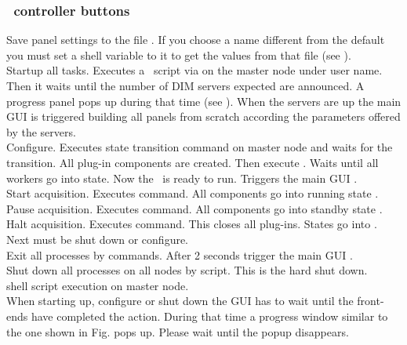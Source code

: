 \subsubsection[DABC controller buttons]{\dabc\ controller buttons}
 Save panel settings to the file .
If you choose a name different from the default you must
set a shell variable to it to get the values from that file
(see ).\\
 Startup all tasks. Executes a \dabc\ script  via  
on the master node under user name. Then it waits until the number of DIM servers
expected are announced. A progress panel pops up during that time
(see ).
When the servers are up the main GUI  is triggered building
all panels from scratch according the parameters offered by the servers.\\
 Configure. Executes state transition command 
on master node and waits for the transition.
All plug-in components are created. Then execute .
Waits until all workers go into  state. Now the \dabc\ is ready to run.
Triggers the main GUI .\\
 Start acquisition. Executes  command.
All components go into running state .\\
 Pause acquisition. Executes  command.
All components go into standby state .\\
 Halt acquisition. Executes  command.
This closes all plug-ins. States go into . Next must be
shut down or configure.\\
 Exit all processes by  commands. After 2 seconds 
trigger the main GUI .\\
 Shut down all processes on all nodes by script. This is the hard shut down.\\
  shell script execution on master node.\\

When starting up, configure or shut down the GUI has to wait
until the front-ends have completed the action.
During that time a progress window similar to the one shown
in Fig.  pops up.
Please wait until the popup disappears.

